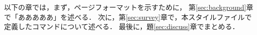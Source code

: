 以下の章では，まず，ページフォーマットを示すために，
第\ref{sec:background}章で「あああああ」を述べる．
次に，第\ref{sec:survey}章で，本スタイルファイルで定義したコマンドについて述べる．
最後に，題\ref{sec:discuss}章でまとめる．



% 
% 
%
% 
% 
% 
% 
